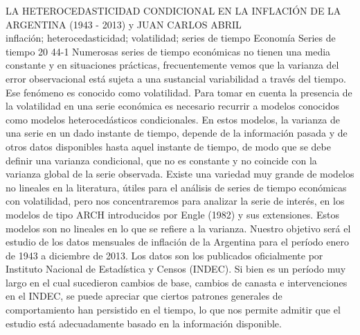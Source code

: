 \A
{LA HETEROCEDASTICIDAD CONDICIONAL EN LA INFLACIÓN DE LA ARGENTINA (1943 - 2013)}
{ y JUAN CARLOS ABRIL}
{
\\}
{inflación; heterocedasticidad; volatilidad; series de tiempo} 
 {Economía} 
 {Series de tiempo} 
 {20} 
 {44-1}
{Numerosas series de tiempo económicas no tienen una media constante y en situaciones prácticas, frecuentemente vemos que la varianza del error observacional está sujeta a una sustancial variabilidad a través del tiempo. Ese fenómeno es conocido como volatilidad. Para tomar en cuenta la presencia de la volatilidad en una serie económica es necesario recurrir a modelos conocidos como modelos heterocedásticos condicionales. En estos modelos, la varianza de una serie en un dado instante de tiempo, depende de la información pasada y de otros datos disponibles hasta aquel instante de tiempo, de modo que se debe definir una varianza condicional, que no es constante y no coincide con la varianza global de la serie observada. Existe una variedad muy grande de modelos no lineales en la literatura, útiles para el análisis de series de tiempo económicas con volatilidad, pero nos concentraremos para analizar la serie de interés, en los modelos de tipo ARCH introducidos por Engle (1982) y sus extensiones. Estos modelos son no lineales en lo que se refiere a la varianza. Nuestro objetivo será el estudio de los datos mensuales de inflación de la Argentina para el período enero de 1943 a diciembre de 2013. Los datos son los publicados oficialmente por Instituto Nacional de Estadística y Censos (INDEC). Si bien es un período muy largo en el cual sucedieron cambios de base, cambios de canasta e intervenciones en el INDEC, se puede apreciar que ciertos patrones generales de comportamiento han persistido en el tiempo, lo que nos permite admitir que el estudio está adecuadamente basado en la información disponible. }
